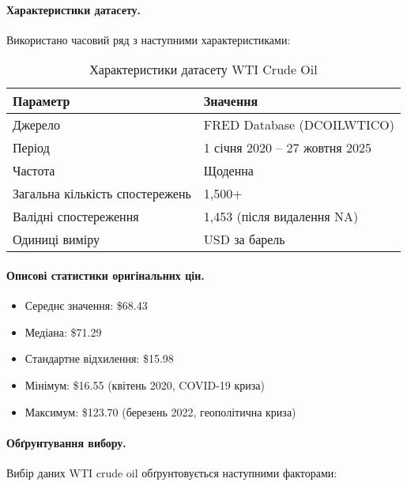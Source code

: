 \documentclass[12pt,a4paper]{article}
\begin{document}
\paragraph{Характеристики датасету.}
Використано часовий ряд з наступними характеристиками:

\begin{table}[h]
\centering
\caption{Характеристики датасету WTI Crude Oil}
\label{tab:wti_characteristics}
\begin{tabular}{ll}
\toprule
\textbf{Параметр} & \textbf{Значення} \\
\midrule
Джерело & FRED Database (DCOILWTICO) \\
Період & 1 січня 2020 -- 27 жовтня 2025 \\
Частота & Щоденна \\
Загальна кількість спостережень & 1,500+ \\
Валідні спостереження & 1,453 (після видалення NA) \\
Одиниці виміру & USD за барель \\
\bottomrule
\end{tabular}
\end{table}

\paragraph{Описові статистики оригінальних цін.}
\begin{itemize}
    \item Середнє значення: \$68.43
    \item Медіана: \$71.29
    \item Стандартне відхилення: \$15.98
    \item Мінімум: \$16.55 (квітень 2020, COVID-19 криза)
    \item Максимум: \$123.70 (березень 2022, геополітична криза)
\end{itemize}

\paragraph{Обґрунтування вибору.}
Вибір даних WTI crude oil обґрунтовується наступними факторами:
\end{document}
